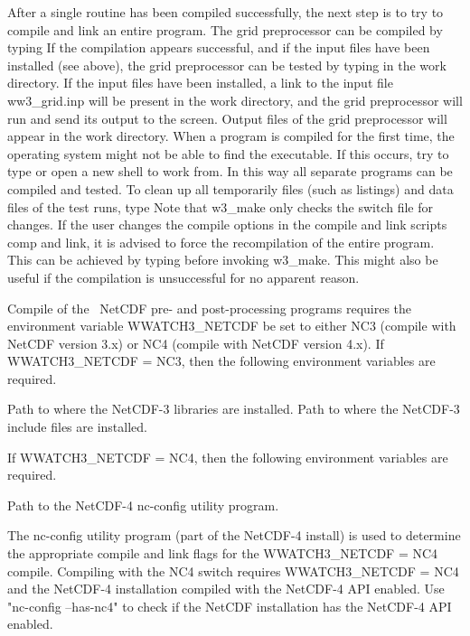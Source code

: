 After a single routine has been compiled successfully, the next step is to try
to compile and link an entire program. The grid preprocessor can be compiled
by typing  If the compilation appears successful,
and if the input files have been installed (see above), the grid preprocessor
can be tested by typing  in the work directory. If the
input files have been installed, a link to the input file {\file
ww3\_grid.inp} will be present in the work directory, and the grid
preprocessor will run and send its output to the screen. Output files of the
grid preprocessor will appear in the work directory. When a program is
compiled for the first time, the operating system might not be able to find
the executable. If this occurs, try to type  or open a new
shell to work from. In this way all separate programs can be compiled and
tested. To clean up all temporarily files (such as listings) and data files of
the test runs, type  Note that {\file w3\_make} only checks
the switch file for changes. If the user changes the compile options in the
compile and link scripts {\file comp} and {\file link}, it is advised to force
the recompilation of the entire program. This can be achieved by typing
 before invoking {\file w3\_make}. This
might also be useful if the compilation is unsuccessful for no apparent
reason.

\vspace{\baselineskip} 
\noindent
Compile of the \ws\ NetCDF pre- and post-processing programs requires the
environment variable {\file WWATCH3\_NETCDF} be set to either
NC3 (compile with NetCDF version 3.x) or
NC4 (compile with NetCDF version 4.x).
If {\file WWATCH3\_NETCDF} = NC3, then the following environment variables
are required.
\begin{flist}
 {Path to where the NetCDF-3 libraries are installed.}
 {Path to where the NetCDF-3 include files are installed.}
\end{flist}
If {\file WWATCH3\_NETCDF} = NC4, then the following environment variables
are required.
\begin{flist}
 {Path to the NetCDF-4 nc-config utility program.}
\end{flist}
The nc-config utility program (part of the NetCDF-4 install) is used to
determine the appropriate compile and link flags for the
{\file WWATCH3\_NETCDF} = NC4 compile.
Compiling with the {\sc NC4} switch requires {\file WWATCH3\_NETCDF} = NC4
and the NetCDF-4 installation compiled with the NetCDF-4 API enabled.
Use "{\code nc-config --has-nc4}" to check if the NetCDF installation has
the NetCDF-4 API enabled.

